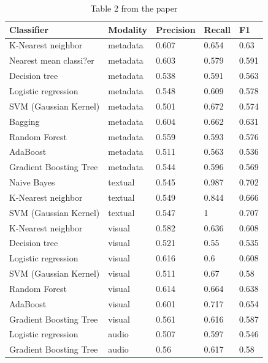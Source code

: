 \documentclass[sigconf]{acmart}
\begin{document}
\begin{table}[]
\caption*{Table 2 from the paper}
\begin{tabular}{lllll}
\hline
Classifier             & Modality & Precision & Recall & F1    \\ \hline
K-Nearest neighbor     & metadata & 0.607     & 0.654  & 0.63  \\
Nearest mean classi?er & metadata & 0.603     & 0.579  & 0.591 \\
Decision tree          & metadata & 0.538     & 0.591  & 0.563 \\
Logistic regression    & metadata & 0.548     & 0.609  & 0.578 \\
SVM (Gaussian Kernel)  & metadata & 0.501     & 0.672  & 0.574 \\
Bagging                & metadata & 0.604     & 0.662  & 0.631 \\
Random Forest          & metadata & 0.559     & 0.593  & 0.576 \\
AdaBoost               & metadata & 0.511     & 0.563  & 0.536 \\
Gradient Boosting Tree & metadata & 0.544     & 0.596  & 0.569 \\
Naive Bayes            & textual  & 0.545     & 0.987  & 0.702 \\
K-Nearest neighbor     & textual  & 0.549     & 0.844  & 0.666 \\
SVM (Gaussian Kernel)  & textual  & 0.547     & 1      & 0.707 \\
K-Nearest neighbor     & visual   & 0.582     & 0.636  & 0.608 \\
Decision tree          & visual   & 0.521     & 0.55   & 0.535 \\
Logistic regression    & visual   & 0.616     & 0.6    & 0.608 \\
SVM (Gaussian Kernel)  & visual   & 0.511     & 0.67   & 0.58  \\
Random Forest          & visual   & 0.614     & 0.664  & 0.638 \\
AdaBoost               & visual   & 0.601     & 0.717  & 0.654 \\
Gradient Boosting Tree & visual   & 0.561     & 0.616  & 0.587 \\
Logistic regression    & audio    & 0.507     & 0.597  & 0.546 \\
Gradient Boosting Tree & audio    & 0.56      & 0.617  & 0.58  \\ \hline
\end{tabular}
\end{table}
\end{document}
